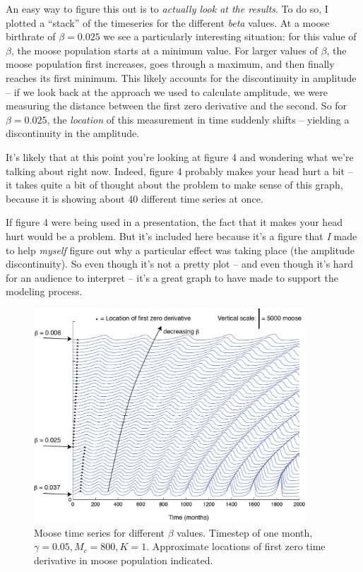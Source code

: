 An easy way to figure this out is to {\it actually look at the results}.  To do so, I plotted a ``stack'' of the timeseries for the different {\it beta} values.  At a moose birthrate of $\beta = 0.025$ we see a particularly interesting situation:  for this value of $\beta$, the moose population starts at a minimum value.  For larger values of $\beta$, the moose population first increases, goes through a maximum, and then finally reaches its first minimum.  This likely accounts for the discontinuity in amplitude -- if we look back at the approach we used to calculate amplitude, we were measuring the distance between the first zero derivative and the second.  So for $\beta = 0.025$, the {\it location} of this measurement in time suddenly shifts -- yielding a discontinuity in the amplitude. 

It's likely that at this point you're looking at figure 4 and wondering what we're talking about right now.  Indeed, figure 4 probably makes your head hurt a bit -- it takes quite a bit of thought about the problem to make sense of this graph, because it is showing about 40 different time series at once.   

If figure 4 were being used in a presentation, the fact that it makes your head hurt would be a problem.  But it's included here because  it's a figure that {\it I} made to help {\it myself} figure out why a particular effect was taking place (the amplitude discontinuity).  So even though it's not a pretty plot -- and even though it's hard for an audience to interpret -- it's a great graph to have made to support the modeling process.

\begin{figure}[h!]
\includegraphics[width=4in]{figs/MooseBCSweepStackWFD}
\caption{Moose time series for different $\beta$ values.  Timestep of one month,  $\gamma = 0.05, M_c = 800, K=1$.  Approximate locations of first zero time derivative in moose population indicated.}
\end{figure}

